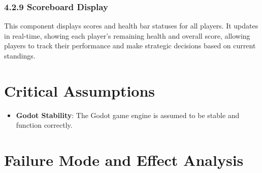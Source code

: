 \documentclass{article}
\begin{document}
\subsubsection*{4.2.9 Scoreboard Display}
This component displays scores and health bar statuses for all players. It updates in real-time, showing each player's remaining health and overall score, allowing players to track their performance and make strategic decisions based on current standings.

\section{Critical Assumptions}

\begin{itemize}
    \item \textbf{Godot Stability}: The Godot game engine is assumed to be stable and function correctly.
\end{itemize}

\section{Failure Mode and Effect Analysis}
\end{document}
